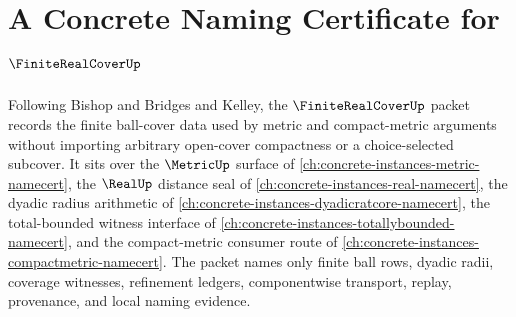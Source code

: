 \chapter{A Concrete Naming Certificate for $\FiniteRealCoverUp$}
\label{ch:concrete-instances-finite-real-cover-namecert}

Following Bishop and Bridges and Kelley, the $\FiniteRealCoverUp$ packet records the finite ball-cover data used by metric and compact-metric arguments without importing arbitrary open-cover compactness or a choice-selected subcover. It sits over the $\MetricUp$ surface of \autoref{ch:concrete-instances-metric-namecert}, the $\RealUp$ distance seal of \autoref{ch:concrete-instances-real-namecert}, the dyadic radius arithmetic of \autoref{ch:concrete-instances-dyadicratcore-namecert}, the total-bounded witness interface of \autoref{ch:concrete-instances-totallybounded-namecert}, and the compact-metric consumer route of \autoref{ch:concrete-instances-compactmetric-namecert}. The packet names only finite ball rows, dyadic radii, coverage witnesses, refinement ledgers, componentwise transport, replay, provenance, and local naming evidence.


